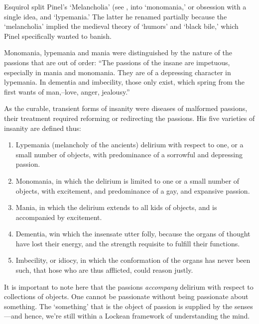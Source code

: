 \begin{refsection}
Esquirol split Pinel's `Melancholia' (see , into `monomania,' or obsession with a single idea, and `lypemania.' The latter he renamed partially because the `melancholia' implied the medieval theory of `humors' and `black bile,' which Pinel specifically wanted to banish. 

Monomania, lypemania and mania were distinguished by the nature of the passions that are out of order: ``The passions of the insane are impetuous, especially in mania and monomania. They are of a depressing character in lypemania. In dementia and imbecility, those only exist, which spring from the first wants of man,--love, anger, jealousy.'' ~\citep[p 26]{Esquirol:1845ug} 

As the curable, transient forms of insanity were diseases of malformed passions, their treatment required reforming or redirecting the passions. His five varieties of insanity are defined thus:

\begin{enumerate}
\item Lypemania (melancholy of the ancients) delirium with respect to one, or a small number of objects, with predominance of a sorrowful and depressing passion.

\item Monomania, in which the delirium is limited to one or a small number of objects, with excitement, and predominance of a gay, and expansive passion.

\item Mania, in which the delirium extends to all kids of objects, and is accompanied by excitement.

\item Dementia, win which the insensate utter folly, because the organs of thought have lost their energy, and the strength requisite to fulfill their functions.

\item Imbecility, or idiocy, in which the conformation of the organs has never been such, that hose who are thus afflicted, could reason justly. ~\citep[p. 29]{Esquirol:1845ug}

\end{enumerate}

It is important to note here that the passions \emph{accompany} delirium with respect to collections of objects. One cannot be passionate without being passionate about something. The `something' that is the object of passion is supplied by the senses---and hence, we're still within a Lockean framework of understanding the mind. 


\end{refsection}
